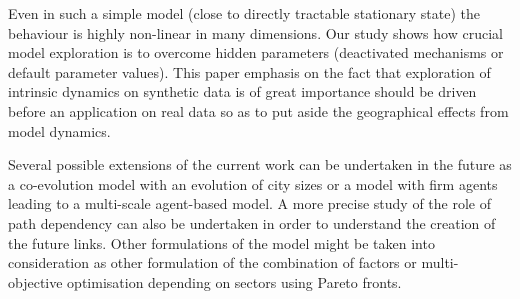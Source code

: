\documentclass[11pt]{article}
\begin{document}
Even in such a simple model (close to directly tractable stationary state) the behaviour is highly non-linear in many dimensions. Our study shows how crucial model exploration is to overcome hidden parameters (deactivated mechanisms or default parameter values). This paper emphasis on the fact that exploration of intrinsic dynamics on synthetic data is of great importance should be driven before an application on real data so as to put aside the geographical effects from model dynamics.

Several possible extensions of the current work can be undertaken in the future as a co-evolution model with an evolution of city sizes or a model with firm agents leading to a multi-scale agent-based model. A more precise study of the role of path dependency can also be undertaken in order to understand the creation of the future links. Other formulations of the model might be taken into consideration as other formulation of the combination of factors or multi-objective optimisation depending on sectors using Pareto fronts.  







%

\end{document}
